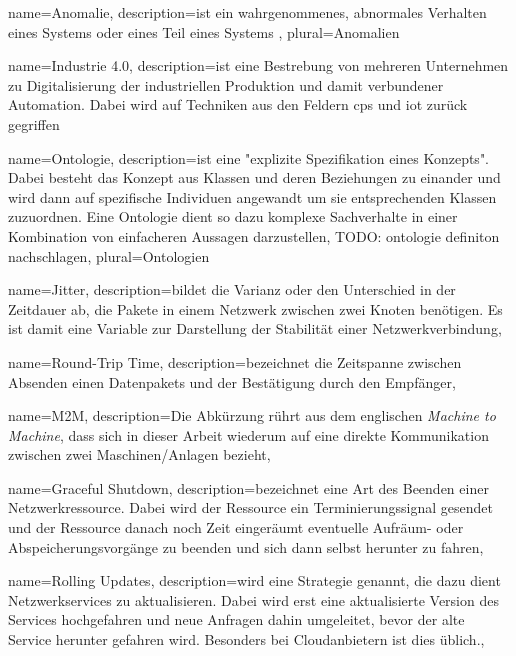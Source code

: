 {
  name={Anomalie},
  description={ist ein wahrgenommenes, abnormales Verhalten eines Systems oder eines Teil eines Systems \cite{pardo2016framework},
  plural={Anomalien}
}

{
  name={Industrie 4.0},
  description={ist eine Bestrebung von mehreren Unternehmen zu Digitalisierung der industriellen Produktion und damit verbundener Automation. Dabei wird auf Techniken aus den Feldern \acrshort{cps} und \acrshort{iot} zurück gegriffen}
}

{
  name={Ontologie},
  description={ist eine "explizite Spezifikation eines Konzepts". \cite{guarino2009ontology} Dabei besteht das Konzept aus Klassen und deren Beziehungen zu einander und wird dann auf spezifische Individuen angewandt um sie entsprechenden Klassen zuzuordnen. Eine Ontologie dient so dazu komplexe Sachverhalte in einer Kombination von einfacheren Aussagen darzustellen, TODO: ontologie definiton nachschlagen},
  plural={Ontologien}
}

{
  name={Jitter},
  description={bildet die Varianz oder den Unterschied in der Zeitdauer ab, die Pakete in einem Netzwerk zwischen zwei Knoten benötigen. Es ist damit eine Variable zur Darstellung der Stabilität einer Netzwerkverbindung},
}

{
  name={Round-Trip Time},
  description={bezeichnet die Zeitspanne zwischen Absenden einen Datenpakets und der Bestätigung durch den Empfänger},
}

{
  name={M2M},
  description={Die Abkürzung rührt aus dem englischen \textit{Machine to Machine}, dass sich in dieser Arbeit wiederum auf eine direkte Kommunikation zwischen zwei Maschinen/Anlagen bezieht},
}

{
  name={Graceful Shutdown},
  description={bezeichnet eine Art des Beenden einer Netzwerkressource. Dabei wird der Ressource ein Terminierungssignal gesendet und der Ressource danach noch Zeit eingeräumt eventuelle Aufräum- oder Abspeicherungsvorgänge zu beenden und sich dann selbst herunter zu fahren},
}

{
  name={Rolling Updates},
  description={wird eine Strategie genannt, die dazu dient Netzwerkservices zu aktualisieren. Dabei wird erst eine aktualisierte Version des Services hochgefahren und neue Anfragen dahin umgeleitet, bevor der alte Service herunter gefahren wird. Besonders bei Cloudanbietern ist dies üblich.},
}

}
